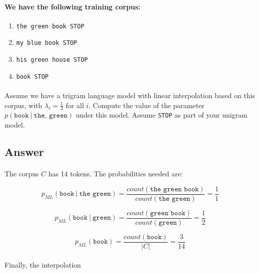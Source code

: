 \documentclass{article}
\newcommand\given[1][]{\:#1\vert\:}
\begin{document}
\paragraph{We have the following training corpus:}

\begin{enumerate}
    \item \texttt{the green book STOP}
    \item \texttt{my blue book STOP}
    \item \texttt{his green house STOP}
    \item \texttt{book STOP}
\end{enumerate}

\paragraph{} Assume we have a trigram language model with linear interpolation based on this corpus, with $\lambda_i = \frac{1}{3}$ for all $i$. Compute the value of the parameter $p(\texttt{book} \given \texttt{the, green})$ under this model. Assume \texttt{STOP} as part of your unigram model.

\subsection*{Answer}

\paragraph{} The corpus $C$ has 14 tokens. The probabilities needed are:

\begin{equation}
p_{ML}(\texttt{book} \given \texttt{the green}) = \frac{count(\texttt{the green book})}{count(\texttt{the green})} = \frac{1}{1}
\end{equation}

\begin{equation}
p_{ML}(\texttt{book} \given \texttt{green})  = \frac{count(\texttt{green book})}{count(\texttt{green})} = \frac{1}{2}
\end{equation}

\begin{equation}
 p_{ML}(\texttt{book}) = \frac{count(\texttt{book})}{|C|} = \frac{3}{14}
\end{equation}

\paragraph{} Finally, the interpolation
\end{document}
